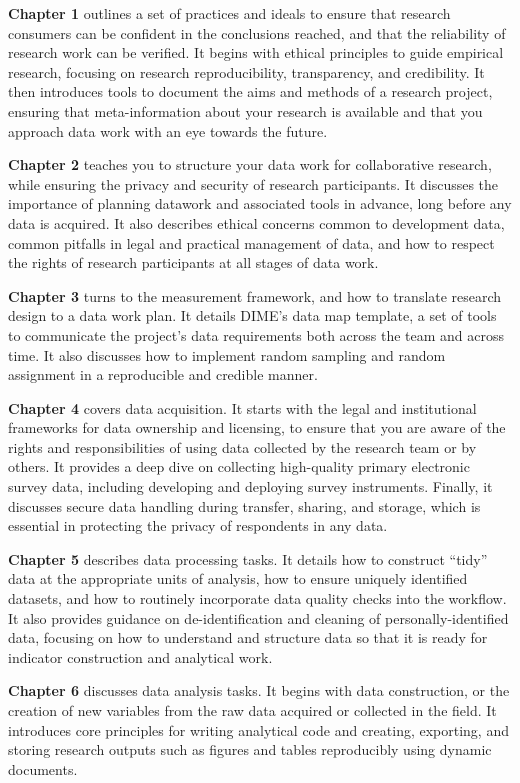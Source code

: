 \textbf{Chapter 1} outlines a set of practices and ideals to ensure that
research consumers can be confident in the conclusions reached,
and that the reliability of research work can be verified.
It begins with ethical principles to guide empirical research,
focusing on research reproducibility, transparency, and credibility.
It then introduces tools to document
the aims and methods of a research project,
ensuring that meta-information about your research is available
and that you approach data work with an eye towards the future.

\textbf{Chapter 2} teaches you to structure your data work for collaborative research,
while ensuring the privacy and security of research participants.
It discusses the importance of planning datawork and associated tools in advance,
long before any data is acquired.
It also describes ethical concerns common to development data,
common pitfalls in legal and practical management of data,
and how to respect the rights of research participants at all stages of data work.

\textbf{Chapter 3} turns to the measurement framework,
and how to translate research design to a data work plan.
It details DIME's data map template, a set of tools to communicate the project's data requirements
both across the team and across time.
It also discusses how to implement random sampling and random assignment
in a reproducible and credible manner.

\textbf{Chapter 4} covers data acquisition. It starts with
the legal and institutional frameworks for data ownership and licensing,
to ensure that you are aware of the rights and responsibilities
of using data collected by the research team or by others.
It provides a deep dive on collecting high-quality primary electronic survey data,
including developing and deploying survey instruments.
Finally, it discusses secure data handling during transfer, sharing, and storage,
which is essential in protecting the privacy of respondents in any data.

\textbf{Chapter 5} describes data processing tasks.
It details how to construct ``tidy'' data at the appropriate units of analysis,
how to ensure uniquely identified datasets, and
how to routinely incorporate data quality checks into the workflow.
It also provides guidance on de-identification and cleaning of personally-identified data,
focusing on how to understand and structure data
so that it is ready for indicator construction and analytical work.

\textbf{Chapter 6} discusses data analysis tasks.
It begins with data construction, or the creation of new variables
from the raw data acquired or collected in the field.
It introduces core principles for writing analytical code
and creating, exporting, and storing research outputs
such as figures and tables reproducibly using dynamic documents.


